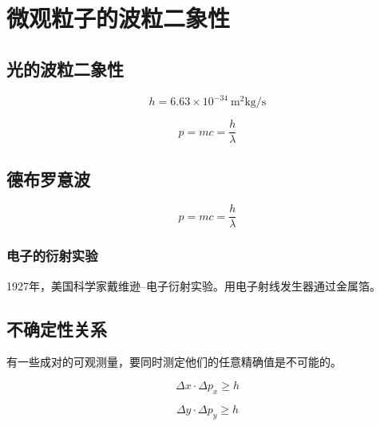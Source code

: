 \section{微观粒子的波粒二象性}

\subsection{光的波粒二象性}

\[
    h = 6.63 \times 10^{-34} \ \mathrm{m^2 kg / s}  
\]

\[
    p = mc = \frac{h}{\lambda} 
\]

\subsection{德布罗意波}

\[
    p = mc = \frac{h}{\lambda} 
\]

\subsubsection{电子的衍射实验}

1927年，美国科学家戴维逊--电子衍射实验。用电子射线发生器通过金属箔。

\subsection{不确定性关系}

有一些成对的可观测量，要同时测定他们的任意精确值是不可能的。

\[
    \Delta x \cdot \Delta p_x \geq h  
\]

\[
    \Delta y \cdot \Delta p_y \geq h  
\]
